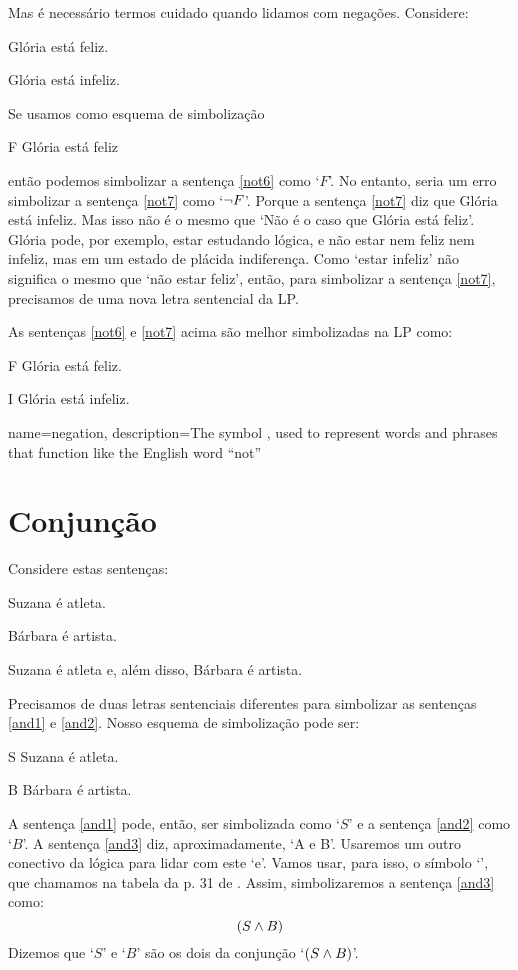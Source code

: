 Mas é necessário termos cuidado quando lidamos com negações. Considere:
	\begin{earg}
		\item[\ex{not6}] Glória está feliz.
		\item[\ex{not7}] Glória está infeliz.
	\end{earg}
Se usamos como esquema de simbolização
	\begin{ekey}
		\item[F] Glória está feliz
	\end{ekey}
então podemos simbolizar a sentença \ref{not6} como `$F$'.
No entanto, seria um erro simbolizar a sentença \ref{not7} como `$\neg{F}$'. 
Porque a sentença \ref{not7} diz que Glória está infeliz.
Mas isso não é o mesmo que `Não é o caso que Glória está feliz'.
Glória pode, por exemplo, estar estudando lógica, e não estar nem feliz nem infeliz, mas em um estado  de plácida indiferença.
Como `estar infeliz' não significa o mesmo que `não estar feliz', então, para simbolizar a sentença \ref{not7}, precisamos de uma nova letra sentencial da LP.

As sentenças \ref{not6} e \ref{not7} acima são melhor simbolizadas na LP como:
	\begin{ekey}
		\item[F] Glória está feliz.
		\item[I] Glória está infeliz.
	\end{ekey}

{
name=negation,
description={The symbol \enot, used to represent words and phrases that function like the English word ``not''}
}


\section{Conjunção}
\label{s:ConnectiveConjunction}

Considere estas sentenças:
	\begin{earg}
		\item[\ex{and1}]Suzana é atleta.
		\item[\ex{and2}]Bárbara é artista.
		\item[\ex{and3}]Suzana é atleta e, além disso, Bárbara é artista.
	\end{earg}
Precisamos de duas letras sentenciais diferentes para simbolizar as sentenças \ref{and1} e \ref{and2}.
Nosso esquema de simbolização pode ser:
	\begin{ekey}
		\item[S] Suzana é atleta.
		\item[B] Bárbara é artista.
	\end{ekey}
A sentença \ref{and1} pode, então, ser simbolizada como `$S$' e a sentença \ref{and2} como `$B$'.
A sentença \ref{and3} diz, aproximadamente, `A e B'.
Usaremos um outro conectivo da lógica para lidar com este `e'.
Vamos usar, para isso, o símbolo `\eand', que chamamos na tabela da p. 31 de .
Assim, simbolizaremos a sentença \ref{and3} como:
$$(S \wedge B)$$
Dizemos que `$S$' e `$B$' são os dois  da conjunção `$(S \wedge B)$'.

